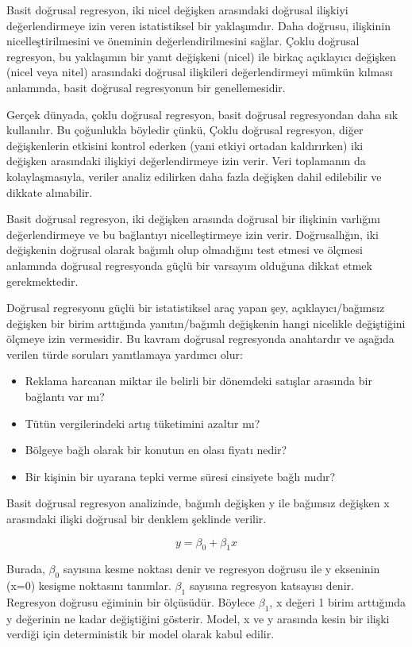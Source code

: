 \documentclass[
  letterpaper,
  DIV=11,
  numbers=noendperiod]{scrreprt}
\begin{document}
Basit doğrusal regresyon, iki nicel değişken arasındaki doğrusal
ilişkiyi değerlendirmeye izin veren istatistiksel bir yaklaşımdır. Daha
doğrusu, ilişkinin nicelleştirilmesini ve öneminin değerlendirilmesini
sağlar. Çoklu doğrusal regresyon, bu yaklaşımın bir yanıt değişkeni
(nicel) ile birkaç açıklayıcı değişken (nicel veya nitel) arasındaki
doğrusal ilişkileri değerlendirmeyi mümkün kılması anlamında, basit
doğrusal regresyonun bir genellemesidir.

Gerçek dünyada, çoklu doğrusal regresyon, basit doğrusal regresyondan
daha sık kullanılır. Bu çoğunlukla böyledir çünkü, Çoklu doğrusal
regresyon, diğer değişkenlerin etkisini kontrol ederken (yani etkiyi
ortadan kaldırırken) iki değişken arasındaki ilişkiyi değerlendirmeye
izin verir. Veri toplamanın da kolaylaşmasıyla, veriler analiz edilirken
daha fazla değişken dahil edilebilir ve dikkate alınabilir.

Basit doğrusal regresyon, iki değişken arasında doğrusal bir ilişkinin
varlığını değerlendirmeye ve bu bağlantıyı nicelleştirmeye izin verir.
Doğrusallığın, iki değişkenin doğrusal olarak bağımlı olup olmadığını
test etmesi ve ölçmesi anlamında doğrusal regresyonda güçlü bir varsayım
olduğuna dikkat etmek gerekmektedir.

Doğrusal regresyonu güçlü bir istatistiksel araç yapan şey,
açıklayıcı/bağımsız değişken bir birim arttığında yanıtın/bağımlı
değişkenin hangi nicelikle değiştiğini ölçmeye izin vermesidir. Bu
kavram doğrusal regresyonda anahtardır ve aşağıda verilen türde soruları
yanıtlamaya yardımcı olur:

\begin{itemize}
\item
  Reklama harcanan miktar ile belirli bir dönemdeki satışlar arasında
  bir bağlantı var mı?
\item
  Tütün vergilerindeki artış tüketimini azaltır mı?
\item
  Bölgeye bağlı olarak bir konutun en olası fiyatı nedir?
\item
  Bir kişinin bir uyarana tepki verme süresi cinsiyete bağlı mıdır?
\end{itemize}

Basit doğrusal regresyon analizinde, bağımlı değişken y ile bağımsız
değişken x arasındaki ilişki doğrusal bir denklem şeklinde verilir.

\[ y=\beta_0+\beta_1x \]

Burada, \(\beta_0\) sayısına kesme noktası denir ve regresyon doğrusu
ile y ekseninin (x=0) kesişme noktasını tanımlar. \(\beta_1\) sayısına
regresyon katsayısı denir. Regresyon doğrusu eğiminin bir ölçüsüdür.
Böylece \(\beta_1\), x değeri 1 birim arttığında y değerinin ne kadar
değiştiğini gösterir. Model, x ve y arasında kesin bir ilişki verdiği
için deterministik bir model olarak kabul edilir.
\end{document}
